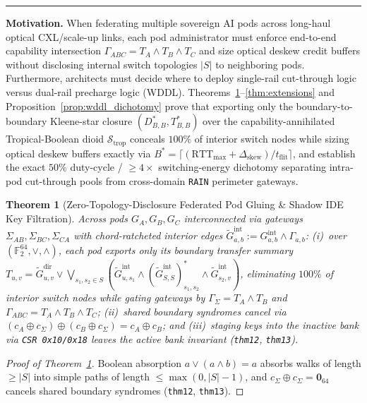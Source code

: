 \documentclass[10pt,twocolumn]{article}
\makeatletter
\newif\ifspecintwocol \specintwocolfalse
\newif\ifspecresume   \specresumefalse
\newcommand{\StopTwoCol}{%
  \if@twocolumn
    \onecolumn
    \global\specintwocolfalse
    \let\spec@next\@empty
  \else
    \ifspecintwocol
      \global\specintwocolfalse
      \def\spec@next{\end{multicols}}%
    \else
      \let\spec@next\@empty
    \fi
  \fi
  \spec@next
}
\newcommand{\BeginConnesPlate}{%
  \if@twocolumn
    \onecolumn
    \global\specresumetrue
    \let\spec@platepre\@empty
  \else
    \ifspecintwocol
      \global\specresumetrue
      \let\spec@platepre\StopTwoCol
    \else
      \global\specresumefalse
      \let\spec@platepre\@empty
    \fi
  \fi
  \spec@platepre
  \par\vspace{4pt}\noindent\textcolor{black!25}{\rule{\textwidth}{0.4pt}}\par\vspace{3pt}%
}
\theoremstyle{spectralthm}
\newtheorem{theorem}{Theorem}[section]
\makeatother
\begin{document}
\BeginConnesPlate
\noindent\textbf{Motivation.}\; When federating multiple sovereign AI pods across long-haul optical CXL/scale-up links, each pod administrator must enforce end-to-end capability intersection $\Gamma_{ABC} = T_A \wedge T_B \wedge T_C$ and size optical deskew credit buffers without disclosing internal switch topologies $|S|$ to neighboring pods. Furthermore, architects must decide where to deploy single-rail cut-through logic versus dual-rail precharge logic (WDDL). Theorems~\ref{thm:pod_gluing}--\ref{thm:extensions} and Proposition~\ref{prop:wddl_dichotomy} prove that exporting only the boundary-to-boundary Kleene-star closure $(D_{B,B}^*, T_{B,B}^*)$ over the capability-annihilated Tropical-Boolean dioid $\mathcal{S}_{\mathrm{trop}}$ conceals $100\%$ of interior switch nodes while sizing optical deskew buffers exactly via $B^* = \lceil(\mathrm{RTT}_{\max}+\Delta_{\mathrm{skew}})/t_{\mathrm{flit}}\rceil$, and establish the exact $50\%$ duty-cycle / $\ge 4\times$ switching-energy dichotomy separating intra-pod cut-through pools from cross-domain \texttt{RAIN} perimeter gateways.

\begin{theorem}[Zero-Topology-Disclosure Federated Pod Gluing \& Shadow IDE Key Filtration]
\label{thm:pod_gluing}
Across pods $G_A, G_B, G_C$ interconnected via gateways $\Sigma_{AB}, \Sigma_{BC}, \Sigma_{CA}$ with chord-ratcheted interior edges $\tilde{G}_{a,b}^{\mathrm{int}} := G_{a,b}^{\mathrm{int}} \wedge \Gamma_{a,b}$: (i)~over $(\mathbb{F}_2^{64}, \vee, \wedge)$, each pod exports only its boundary transfer summary $T_{u,v} = \tilde{G}_{u,v}^{\mathrm{dir}} \vee \bigvee_{s_1, s_2 \in S} (\tilde{G}_{u,s_1}^{\mathrm{int}} \wedge (\tilde{G}_{S,S}^{\mathrm{int}})_{s_1,s_2}^* \wedge \tilde{G}_{s_2,v}^{\mathrm{int}})$, eliminating $100\%$ of interior switch nodes while gating gateways by $\Gamma_\Sigma = T_A \wedge T_B$ and $\Gamma_{ABC} = T_A \wedge T_B \wedge T_C$; (ii)~shared boundary syndromes cancel via $(c_A \oplus c_\Sigma) \oplus (c_B \oplus c_\Sigma) = c_A \oplus c_B$; and (iii)~staging keys into the inactive bank via \texttt{CSR 0x10/0x18} leaves the active bank invariant (\texttt{thm12}, \texttt{thm13}).
\end{theorem}
\begin{proof}[Proof of Theorem~\ref{thm:pod_gluing}]
Boolean absorption $a \vee (a \wedge b) = a$ absorbs walks of length $\ge |S|$ into simple paths of length $\le \max(0, |S|-1)$, and $c_\Sigma \oplus c_\Sigma = \mathbf{0}_{64}$ cancels shared boundary syndromes (\texttt{thm12}, \texttt{thm13}).
\end{proof}
\end{document}
